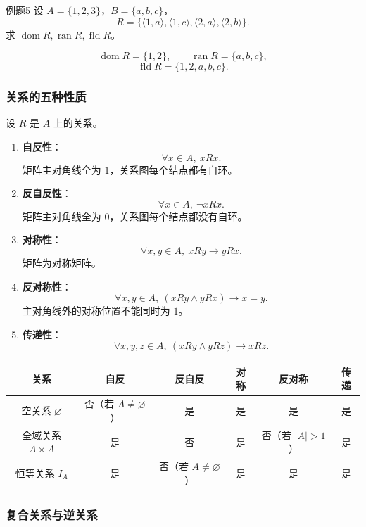 \begin{question}{例题5}
	设 \(A=\{1,2,3\}\)，\(B=\{a,b,c\}\)，
	\[
	R=\{\langle1,a\rangle,\langle1,c\rangle,\langle2,a\rangle,\langle2,b\rangle\}.
	\]
	求 \(\operatorname{dom}R,\operatorname{ran}R,\operatorname{fld}R\)。
	
	\begin{solution}
	\[
	\operatorname{dom}R=\{1,2\},\qquad \operatorname{ran}R=\{a,b,c\},
	\]
	\[
	\operatorname{fld}R=\{1,2,a,b,c\}.
	\]
	\end{solution}
\end{question}

\subsubsection{关系的五种性质}

设 \(R\) 是 \(A\) 上的关系。
\begin{enumerate}
	\item \textbf{自反性}：
	\[
	\forall x\in A,\ xRx.
	\]
	矩阵主对角线全为 \(1\)，关系图每个结点都有自环。
	\item \textbf{反自反性}：
	\[
	\forall x\in A,\ \neg xRx.
	\]
	矩阵主对角线全为 \(0\)，关系图每个结点都没有自环。
	\item \textbf{对称性}：
	\[
	\forall x,y\in A,\ xRy\to yRx.
	\]
	矩阵为对称矩阵。
	\item \textbf{反对称性}：
	\[
	\forall x,y\in A,\ (xRy\land yRx)\to x=y.
	\]
	主对角线外的对称位置不能同时为 \(1\)。
	\item \textbf{传递性}：
	\[
	\forall x,y,z\in A,\ (xRy\land yRz)\to xRz.
	\]
\end{enumerate}

\begin{center}
	\begin{tabular}{cccccc}
		\toprule
		关系 & 自反 & 反自反 & 对称 & 反对称 & 传递\\
		\midrule
		空关系 \(\varnothing\) & 否（若 \(A\ne\varnothing\)） & 是 & 是 & 是 & 是\\
		全域关系 \(A\times A\) & 是 & 否 & 是 & 否（若 \(|A|>1\)） & 是\\
		恒等关系 \(I_A\) & 是 & 否（若 \(A\ne\varnothing\)） & 是 & 是 & 是\\
		\bottomrule
	\end{tabular}
\end{center}

\subsubsection{复合关系与逆关系}

